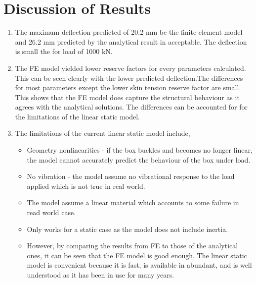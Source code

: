 \documentclass[11pt,a4paper,oneside]{memoir}
\begin{document}
\section{Discussion of Results}

\begin{enumerate}
    \item The maximum deflection predicted of 20.2 mm be the finite element model and 26.2 mm predicted by the analytical result in acceptable. The deflection is small the for load of 1000 kN. 
    \item The FE model yielded lower reserve factors for every parameters calculated. This can be seen clearly with the lower predicted deflection.The differences for most parameters except the lower skin tension reserve factor are small. This shows that the FE model does capture the structural behaviour as it agrees with the analytical solutions. The differences can be accounted for for the limitations of the linear static model.
    \item The limitations of the current linear static model include,
    \begin{itemize}
        \item Geometry nonlinearities - if the box buckles and becomes no longer linear, the model cannot accurately predict the behaviour of the box under load.
        \item No vibration - the model assume no vibrational response to the load applied which is not true in real world. 
        \item The model assume a linear material which accounts to some failure in read world case.
        \item Only works for a static case as the model does not include inertia.
    \item However, by comparing the results from FE to those of the analytical ones, it can be seen that the FE model is good enough. The linear static model is convenient because it is fast, is available in abundant, and is well understood as it has been in use for many years.
    \end{itemize}
\end{enumerate}
\end{document}
